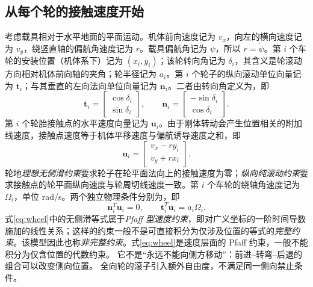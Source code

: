 \documentclass[UTF8,a4paper,fontset=fandol,11pt]{ctexart}
\newcommand{\vct}[1]{\bm #1}
\begin{document}
\subsection{从每个轮的接触速度开始}
考虑载具相对于水平地面的平面运动。机体前向速度记为 $v_x$，向左的横向速度记为 $v_y$，绕竖直轴的偏航角速度记为 $r$。载具偏航角记为 $\psi$，所以 $r=\dot\psi$。第 $i$ 个车轮的安装位置（机体系下）记为 $(x_i,y_i)$；该轮转向角记为 $\delta_i$，其含义是轮滚动方向相对机体前向轴的夹角；轮半径记为 $a_i$。第 $i$ 个轮子的纵向滚动单位向量记为 $\vct t_i$；与其垂直的左向法向单位向量记为 $\vct n_i$。二者由转向角定义为，即
\begin{equation}
 \vct t_i=\begin{bmatrix}\cos\delta_i\\\sin\delta_i\end{bmatrix},\qquad
 \vct n_i=\begin{bmatrix}-\sin\delta_i\\\cos\delta_i\end{bmatrix}.
\end{equation}
第 $i$ 个轮胎接触点的水平速度向量记为 $\vct u_i$。由于刚体转动会产生位置相关的附加线速度，接触点速度等于机体平移速度与偏航诱导速度之和，即
\begin{equation}
 \vct u_i=\begin{bmatrix}v_x-r y_i\\v_y+r x_i\end{bmatrix}.
\end{equation}
轮地\emph{理想无侧滑约束}要求轮子在轮平面法向上的接触速度为零；\emph{纵向纯滚动约束}要求接触点的轮平面纵向速度与轮周切线速度一致。第 $i$ 个车轮的绕轴角速度记为 $\Omega_i$，单位 rad/s。两个独立物理条件分别为，即
\begin{equation}\label{eq:wheel}
 \boxed{\vct n_i^T\vct u_i=0},\qquad
 \vct t_i^T\vct u_i=a_i\Omega_i.
\end{equation}
式\eqref{eq:wheel}中的无侧滑等式属于\emph{Pfaff 型速度约束}，即对广义坐标的一阶时间导数施加的线性关系；这样的约束一般不是可直接积分为仅涉及位置的等式的\emph{完整约束}。该模型因此也称\emph{非完整约束}。式\eqref{eq:wheel}是速度层面的 Pfaff 约束，一般不能积分为仅含位置的代数约束。
它不是“永远不能向侧方移动”：前进--转弯--后退的组合可以改变侧向位置。
全向轮的滚子引入额外自由度，不满足同一侧向禁止条件。
\end{document}
